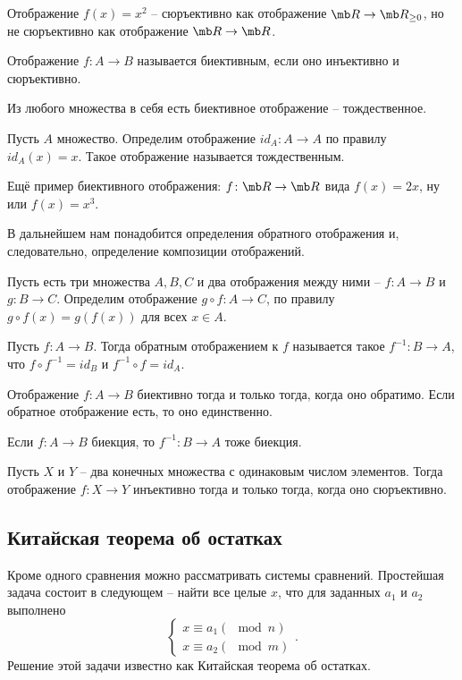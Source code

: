 Отображение $f(x)=x^2$ -- сюръективно как отображение $\mb R \to \mb R_{\geq 0}$, но не сюръективно как отображение $\mb R \to \mb R$.

\dfn Отображение $f \colon A \to B$ называется биективным, если оно инъективно и сюръективно.
\edfn



Из любого множества в себя есть биективное отображение -- тождественное.



\dfn Пусть $A$ множество. Определим отображение $id_A \colon A \to A$ по правилу $id_A(x)=x$. Такое отображение называется тождественным.
\edfn

Ещё пример биективного отображения: $f \colon \mb R \to \mb R$ вида $f(x)=2x$, ну или $f(x)=x^3$.


В дальнейшем нам понадобится определения обратного отображения и, следовательно, определение композиции отображений.

\dfn Пусть есть три множества $A,B,C$ и два отображения между ними -- $f\colon A \to B$ и $g\colon B \to C$. Определим отображение $g \circ f \colon A \to C$, по правилу $g\circ f(x)= g(f(x))$ для всех $x \in A$. 
\edfn

\dfn Пусть $f \colon A \to B$. Тогда обратным отображением к $f$ называется такое $f^{-1}\colon B \to A$, что $f \circ f^{-1}= id_B$ и $f^{-1}\circ f= id_A$. 
\edfn



\thrm Отображение $f \colon A \to B$ биективно тогда и только тогда, когда оно обратимо. Если обратное отображение есть, то оно единственно.
\ethrm

\crl Если $f \colon A \to B$ биекция, то $f^{-1}\colon B \to A$ тоже биекция.
\ecrl

 Пусть $X$ и $Y$ -- два конечных множества с одинаковым числом элементов. Тогда отображение  $f\colon X \to Y$ инъективно тогда и только тогда, когда оно сюръективно.
\ethrm

\subsection{Китайская теорема об остатках}

Кроме одного сравнения можно рассматривать системы сравнений. Простейшая задача состоит в следующем -- найти все целые $x$, что для заданных $a_1$ и $a_2$ выполнено
$$ \begin{cases}
x\equiv a_1 (\mod n)\\
x\equiv a_2 (\mod m)
\end{cases}.$$
Решение этой задачи известно как Китайская теорема об остатках.


